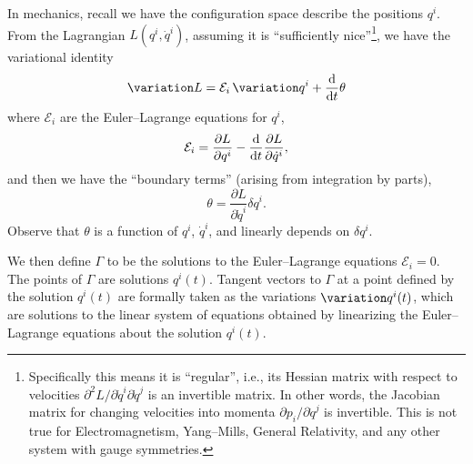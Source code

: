 \M %
In mechanics, recall we have the configuration space describe the
positions $q^{i}$. From the Lagrangian $L(q^{i},\dot{q}^{i})$, assuming
it is ``sufficiently nice''\footnote{Specifically this means it is
``regular'', i.e., its Hessian matrix with respect to velocities $\partial^{2}L/\partial\dot{q}^{i}\partial\dot{q}^{j}$
is an invertible matrix. In other words, the Jacobian matrix for
changing velocities into momenta $\partial p_{i}/\partial\dot{q}^{j}$ is
invertible. This is not true for Electromagnetism, Yang--Mills, General
Relativity, and any other system with gauge symmetries.}, we have the
variational identity
\begin{equation}
\variation L = \mathcal{E}_{i}\,\variation q^{i} + \frac{\D}{\D t}\theta
\end{equation}
where $\mathcal{E}_{i}$ are the Euler--Lagrange equations for $q^{i}$,
\begin{equation}
\mathcal{E}_{i} = \frac{\partial L}{\partial q^{i}}
-\frac{\mathrm{d}}{\mathrm{d} t}\frac{\partial L}{\partial\dot{q}^{i}},
\end{equation}
and then we have the ``boundary terms'' (arising from integration by parts),
\begin{equation}\label{eq:classical-field-theory:hamiltonian:symplectic-form:theta}
\theta = \frac{\partial L}{\partial\dot{q}^{i}}\delta q^{i}.
\end{equation}
Observe that $\theta$ is a function of $q^{i}$, $\dot{q}^{i}$, and
linearly depends on $\delta q^{i}$.

\M
We then define $\Gamma$ to be the solutions to the Euler--Lagrange
equations $\mathcal{E}_{i}=0$. The points of $\Gamma$ are solutions $q^{i}(t)$.
Tangent vectors to $\Gamma$ at a point defined by the solution $q^{i}(t)$
are formally taken as the variations $\variation q^{i}(t)$, which are
solutions to the linear system of equations obtained by linearizing the
Euler--Lagrange equations about the solution $q^{i}(t)$.

